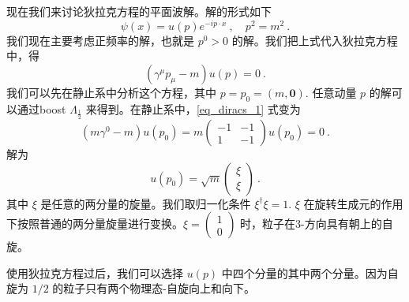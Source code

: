 
现在我们来讨论狄拉克方程的平面波解。解的形式如下
\begin{equation}
\psi(x) = u(p)e^{-ip\cdot x}~, \quad p^2 = m^2~.
\end{equation}
我们现在主要考虑正频率的解，也就是 $p^0>0$ 的解。我们把上式代入狄拉克方程中，得
\begin{equation}\label{eq_diracs_1}
(\gamma^\mu p_\mu - m) u(p) = 0~.
\end{equation}
我们可以先在静止系中分析这个方程，其中 $p=p_0=(m,\boldsymbol 0 )$. 任意动量 $p$ 的解可以通过boost $\Lambda_{\frac{1}{2}}$ 来得到。在静止系中，\autoref{eq_diracs_1} 式变为
\begin{equation}
(m\gamma^0-m)u(p_0) = m\begin{pmatrix}
-1 & -1 \\
 1 & -1
\end{pmatrix}u(p_0) = 0 ~.
\end{equation}
解为
\begin{equation}
u(p_0) = \sqrt{m} \begin{pmatrix}
\xi \\ \xi
\end{pmatrix}~.
\end{equation}
其中 $\xi$ 是任意的两分量的旋量。我们取归一化条件 $\xi^\dagger \xi =1$. $\xi$ 在旋转生成元的作用下按照普通的两分量旋量进行变换。$\xi = \begin{pmatrix}
1 \\0
\end{pmatrix}$ 时，粒子在3-方向具有朝上的自旋。

使用狄拉克方程过后，我们可以选择 $u(p)$ 中四个分量的其中两个分量。因为自旋为 $1/2$ 的粒子只有两个物理态-自旋向上和向下。

